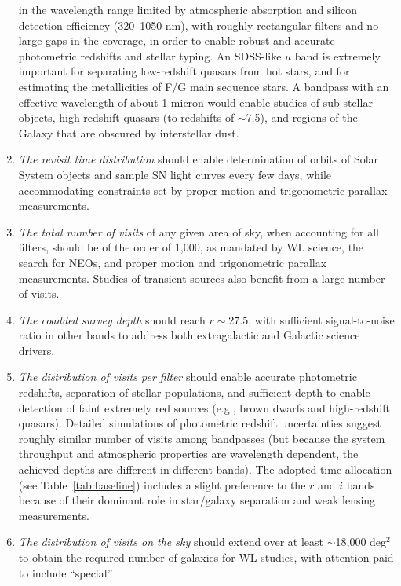 \begin{enumerate}
    in the wavelength range limited by atmospheric absorption and
    silicon detection efficiency (320--1050 nm), with roughly
    rectangular filters and no large gaps in the coverage, in order
    to enable robust and accurate photometric redshifts and stellar typing. An
    SDSS-like $u$ band \citep{1996AJ....111.1748F} is extremely important for separating
    low-redshift quasars from hot stars, and for estimating the metallicities of
    F/G main sequence stars. A bandpass with an effective wavelength of
    about 1 micron  would enable studies of sub-stellar objects, high-redshift
    quasars (to redshifts of $\sim$7.5), and regions of the Galaxy that are obscured
    by interstellar dust.
\item  \textit{The revisit time distribution} should enable determination of
   orbits of Solar System objects and sample SN light curves every few days,
   while accommodating constraints set by proper motion and trigonometric
   parallax measurements.
\item  \textit{The total number of visits} of any given area of sky, when accounting for all
   filters, should be of the order of 1,000, as mandated by WL
   science, the search for NEOs, and proper motion and
   trigonometric parallax measurements. Studies of transient sources
   also benefit from a large number of visits.
\item  \textit{The coadded survey depth} should reach
    $r\sim27.5$, with sufficient signal-to-noise ratio in other bands
    to address both extragalactic and Galactic science drivers.
\item  \textit{The distribution of visits per filter} should enable
   accurate photometric redshifts, separation of stellar populations,
   and sufficient depth to enable detection of faint extremely red
   sources (e.g., brown dwarfs and high-redshift quasars). Detailed simulations of
   photometric redshift uncertainties
   suggest roughly similar number of visits among bandpasses
   (but because the system throughput and atmospheric properties are
    wavelength dependent, the achieved depths are different in different
    bands). The adopted time allocation
   (see Table~\ref{tab:baseline}) includes a slight preference to the $r$ and $i$ bands because of their
   dominant role in star/galaxy separation and weak lensing measurements.
\item  \textit{The distribution of visits on the sky} should extend over
   at least $\sim$18,000 deg$^2$ to obtain the required number of galaxies
   for WL studies, with attention paid to include ``special''

\end{enumerate}
